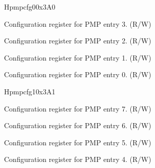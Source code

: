 \begin{register}{H}{pmpcfg0}{0x3A0}
\label{regdesc:pmpcfg0}%
%
%
%
%
\regnewline%
\begin{regdesc}
\begin{reglist}
\label{fielddesc:pmp3cfg}\item [pmp3cfg] Configuration register for PMP entry 3. (R/W)
\label{fielddesc:pmp2cfg}\item [pmp2cfg] Configuration register for PMP entry 2. (R/W)
\label{fielddesc:pmp1cfg}\item [pmp1cfg] Configuration register for PMP entry 1. (R/W)
\label{fielddesc:pmp0cfg}\item [pmp0cfg] Configuration register for PMP entry 0. (R/W)
\end{reglist}
\end{regdesc}
\end{register}

\begin{register}{H}{pmpcfg1}{0x3A1}
\label{regdesc:pmpcfg1}%
%
%
%
%
\regnewline%
\begin{regdesc}
\begin{reglist}
\label{fielddesc:pmp7cfg}\item [pmp7cfg] Configuration register for PMP entry 7. (R/W)
\label{fielddesc:pmp6cfg}\item [pmp6cfg] Configuration register for PMP entry 6. (R/W)
\label{fielddesc:pmp5cfg}\item [pmp5cfg] Configuration register for PMP entry 5. (R/W)
\label{fielddesc:pmp4cfg}\item [pmp4cfg] Configuration register for PMP entry 4. (R/W)
\end{reglist}
\end{regdesc}
\end{register}

